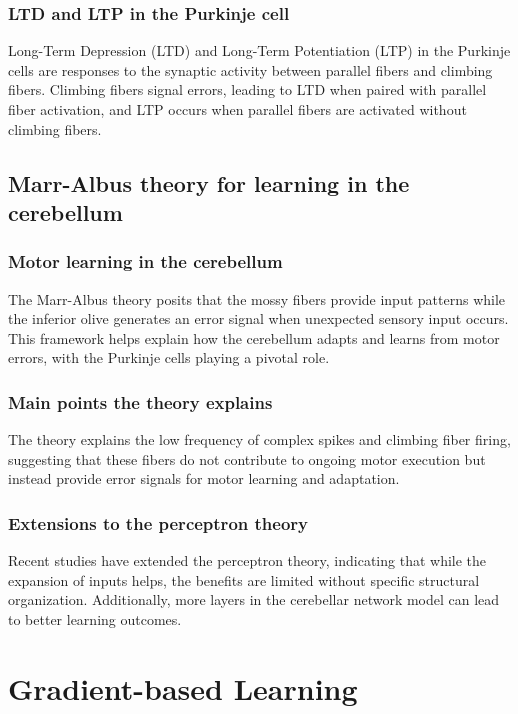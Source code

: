 \documentclass[11pt]{book} %
\begin{document}
\subsubsection{LTD and LTP in the Purkinje cell}
Long-Term Depression (LTD) and Long-Term Potentiation (LTP) in the Purkinje cells are responses to the synaptic activity between parallel fibers and climbing fibers. Climbing fibers signal errors, leading to LTD when paired with parallel fiber activation, and LTP occurs when parallel fibers are activated without climbing fibers.

\subsection{Marr-Albus theory for learning in the cerebellum}

\subsubsection{Motor learning in the cerebellum}
The Marr-Albus theory posits that the mossy fibers provide input patterns while the inferior olive generates an error signal when unexpected sensory input occurs. This framework helps explain how the cerebellum adapts and learns from motor errors, with the Purkinje cells playing a pivotal role.

\subsubsection{Main points the theory explains}
The theory explains the low frequency of complex spikes and climbing fiber firing, suggesting that these fibers do not contribute to ongoing motor execution but instead provide error signals for motor learning and adaptation.

\subsubsection{Extensions to the perceptron theory}
Recent studies have extended the perceptron theory, indicating that while the expansion of inputs helps, the benefits are limited without specific structural organization. Additionally, more layers in the cerebellar network model can lead to better learning outcomes.

%
%
%

\section{Gradient-based Learning}
\end{document}
